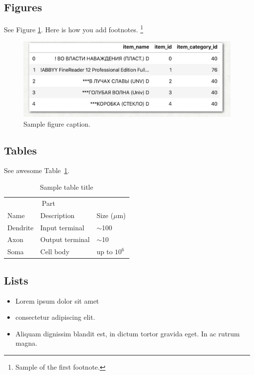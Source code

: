\documentclass{article}
\begin{document}
\subsection{Figures}

See Figure \ref{fig:fig1}. Here is how you add footnotes. \footnote{Sample of the first footnote.}


\begin{figure} %
    \centering
    \includegraphics{test.png}
    \caption{Sample figure caption.}
    \label{fig:fig1}
\end{figure}

\subsection{Tables}

See awesome Table~\ref{tab:table}.

\begin{table}
 \caption{Sample table title}
  \centering
  \begin{tabular}{lll}
    \toprule
    \multicolumn{2}{c}{Part}                   \\
    \cmidrule(r){1-2}
    Name     & Description     & Size ($\mu$m) \\
    \midrule
    Dendrite & Input terminal  & $\sim$100     \\
    Axon     & Output terminal & $\sim$10      \\
    Soma     & Cell body       & up to $10^6$  \\
    \bottomrule
  \end{tabular}
  \label{tab:table}
\end{table}

\subsection{Lists}
\begin{itemize}
\item Lorem ipsum dolor sit amet
\item consectetur adipiscing elit. 
\item Aliquam dignissim blandit est, in dictum tortor gravida eget. In ac rutrum magna.
\end{itemize}


%  
 
  

\end{document}
